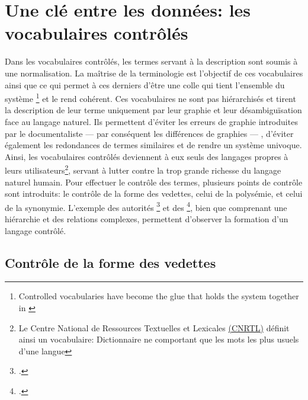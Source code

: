 \section{\label{I-A-2}Une clé entre les données: les vocabulaires contrôlés}

Dans les vocabulaires contrôlés, les termes servant à la description sont soumis à une normalisation. La maîtrise de la terminologie est l'objectif de ces vocabulaires ainsi que ce qui permet à ces derniers d'être une \og colle qui tient l'ensemble du système \footnote{\og Controlled vocabularies have become the glue that holds the system together \fg{} in \cite{rosenfeld_information_2015}}\fg{} et le rend cohérent. Ces vocabulaires ne sont pas hiérarchisés et tirent la description de leur terme uniquement par leur graphie et leur désambiguïsation face au langage naturel. Ils permettent d'éviter les erreurs de graphie introduites par le documentaliste --- par conséquent les différences de graphies --- , d'éviter également les redondances de termes similaires et de rendre un système univoque.
Ainsi, les vocabulaires contrôlés deviennent à eux seuls des langages propres à leurs utilisateurs\footnote{Le Centre National de Ressources Textuelles et Lexicales \href{https://www.cnrtl.fr/definition/vocabulaire}{(CNRTL)} définit ainsi un vocabulaire: \og Dictionnaire ne comportant que les mots les plus usuels d'une langue\fg{}}, servant à lutter contre la trop grande richesse du langage naturel humain.
Pour effectuer le contrôle des termes, plusieurs points de contrôle sont introduits: le contrôle de la forme des vedettes, celui de la polysémie, et celui de la synonymie. L'exemple des autorités \footcite{bibliotheque_nationale_de_france_rameau_nodate} et des \footcite{the_library_of_congress_library_nodate}, bien que comprenant une hiérarchie et des relations complexes, permettent d'observer la formation d'un langage contrôlé.

\subsection{\label{I-A-2-a}Contrôle de la forme des vedettes}

